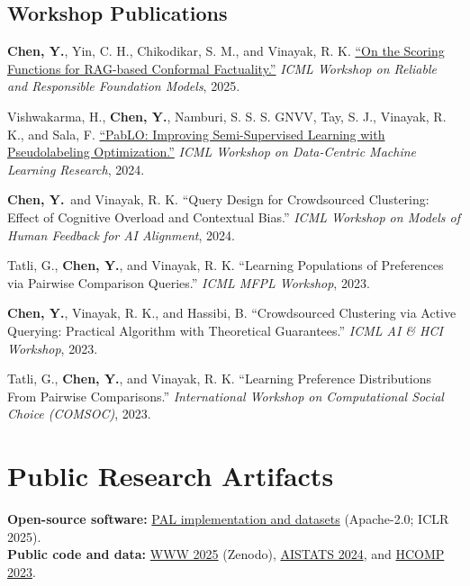 \documentclass[11pt,letterpaper]{article}
\newcommand{\me}{\textbf{Chen, Y.}}
\begin{document}
\subsection*{Workshop Publications}
\begin{pubs}[resume]
\item \me, Yin, C. H., Chikodikar, S. M., and Vinayak, R. K.
\href{https://openreview.net/forum?id=BYVo4s8AcE}{``On the Scoring Functions for RAG-based Conformal Factuality.''}
\textit{ICML Workshop on Reliable and Responsible Foundation Models}, 2025.

\item Vishwakarma, H., \me, Namburi, S. S. S. GNVV, Tay, S. J., Vinayak, R. K., and Sala, F.
\href{https://openreview.net/forum?id=2Nd3qXcAnJ}{``PabLO: Improving Semi-Supervised Learning with Pseudolabeling Optimization.''}
\textit{ICML Workshop on Data-Centric Machine Learning Research}, 2024.

\item \me\ and Vinayak, R. K.
``Query Design for Crowdsourced Clustering: Effect of Cognitive Overload and Contextual Bias.''
\textit{ICML Workshop on Models of Human Feedback for AI Alignment}, 2024.

\item Tatli, G., \me, and Vinayak, R. K.
``Learning Populations of Preferences via Pairwise Comparison Queries.''
\textit{ICML MFPL Workshop}, 2023.

\item \me, Vinayak, R. K., and Hassibi, B.
``Crowdsourced Clustering via Active Querying: Practical Algorithm with Theoretical Guarantees.''
\textit{ICML AI \& HCI Workshop}, 2023.

\item Tatli, G., \me, and Vinayak, R. K.
``Learning Preference Distributions From Pairwise Comparisons.''
\textit{International Workshop on Computational Social Choice (COMSOC)}, 2023.
\end{pubs}

\section*{Public Research Artifacts}
\textbf{Open-source software:} \href{https://github.com/RamyaLab/pluralistic-alignment}{PAL implementation and datasets} (Apache-2.0; ICLR 2025).\\
\textbf{Public code and data:}
\href{https://github.com/kitkatdafu/cognitive-overload-contextual-bias}{WWW 2025} (Zenodo),
\href{https://github.com/ramyakv/Learning-Population-of-Preferences-AISTATS2024}{AISTATS 2024}, and
\href{https://github.com/kitkatdafu/crowd-active-clustering}{HCOMP 2023}.
\end{document}
